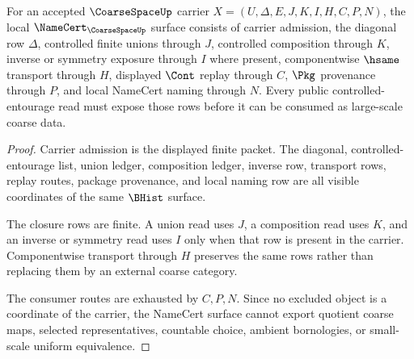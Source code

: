 \begin{theorem}
\label{thm:coarse-space-namecert-obligations}
For an accepted $\CoarseSpaceUp$ carrier $X=(U,\Delta,E,J,K,I,H,C,P,N)$, the local $\NameCert_{\CoarseSpaceUp}$ surface consists of carrier admission, the diagonal row $\Delta$, controlled finite unions through $J$, controlled composition through $K$, inverse or symmetry exposure through $I$ where present, componentwise $\hsame$ transport through $H$, displayed $\Cont$ replay through $C$, $\Pkg$ provenance through $P$, and local NameCert naming through $N$. Every public controlled-entourage read must expose those rows before it can be consumed as large-scale coarse data.
\end{theorem}
\begin{proof}
Carrier admission is the displayed finite packet. The diagonal, controlled-entourage list, union ledger, composition ledger, inverse row, transport rows, replay routes, package provenance, and local naming row are all visible coordinates of the same $\BHist$ surface.

The closure rows are finite. A union read uses $J$, a composition read uses $K$, and an inverse or symmetry read uses $I$ only when that row is present in the carrier. Componentwise transport through $H$ preserves the same rows rather than replacing them by an external coarse category.

The consumer routes are exhausted by $C,P,N$. Since no excluded object is a coordinate of the carrier, the NameCert surface cannot export quotient coarse maps, selected representatives, countable choice, ambient bornologies, or small-scale uniform equivalence.
\end{proof}

